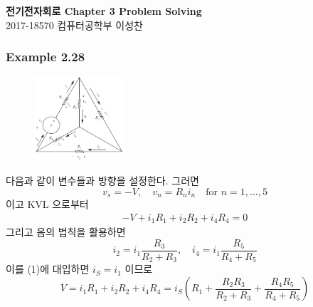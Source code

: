 \documentclass[13pt]{article}
\begin{document}
\begin{center}
\textbf{\Large 전기전자회로 Chapter 3 Problem Solving} \\
\large 2017-18570 컴퓨터공학부 이성찬
\end{center}

\subsubsection*{Example 2.28} 
\begin{figure}\centering\includegraphics[width=0.3\textwidth]{ex2_28}\end{figure}
다음과 같이 변수들과 방향을 설정한다. 그러면 $$v_s=-V, \quad v_n=R_ni_n \quad \text{for } n = 1, \dots, 5$$ 이고 KVL 으로부터
\begin{align}
-V+i_1R_1 + i_2R_2 + i_4R_4 = 0
\end{align}
그리고 옴의 법칙을 활용하면 $$i_2 = i_1\frac{R_3}{R_2+R_3}, \quad i_4 = i_1\frac{R_5}{R_4+R_5}$$
이를 (1)에 대입하면 $i_S=i_1$ 이므로
$$V = i_1R_1 + i_2R_2 + i_4R_4 = i_S\left(R_1 + \frac{R_2R_3}{R_2+R_3} + \frac{R_4R_5}{R_4+R_5}\right)$$
\end{document}
